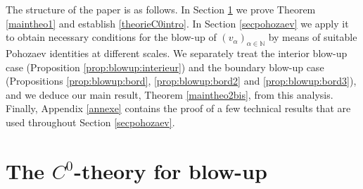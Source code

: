 \documentclass[10pt]{amsart}
\numberwithin{equation}{section}
\theoremstyle{plain}
\theoremstyle{remark}
\begin{document}
\medskip

The structure of the paper is as follows. In Section \ref{secprovetheo1} we prove Theorem \ref{maintheo1} and establish \eqref{theorieC0intro}. In Section \ref{secpohozaev} we apply it to obtain necessary conditions for the blow-up of $(v_\alpha)_{\alpha \in \mathbb{N}}$ by means of suitable Pohozaev identities at different scales. We separately treat the interior blow-up case (Proposition \ref{prop:blowup:interieur}) and the boundary blow-up case (Propositions \ref{prop:blowup:bord}, \ref{prop:blowup:bord2} and \ref{prop:blowup:bord3}), and we deduce our main result, Theorem \ref{maintheo2bis}, from this analysis. Finally, Appendix \ref{annexe} contains the proof of a few technical results that are used throughout Section \ref{secpohozaev}. 



\section{The $C^0$-theory for blow-up}\label{secprovetheo1}
	
\end{document}
